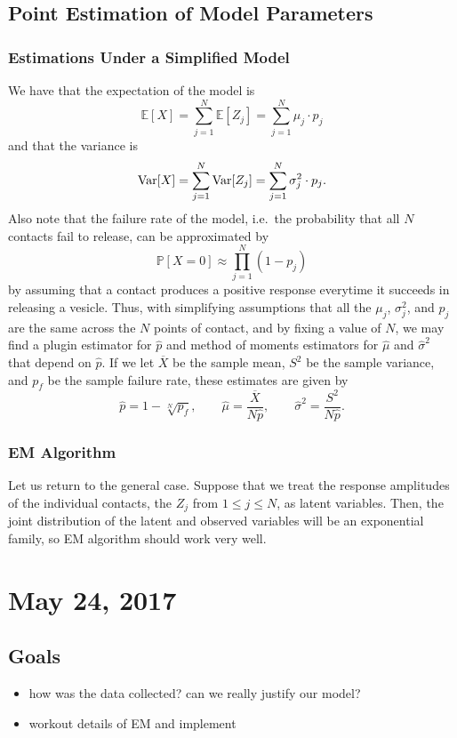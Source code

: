 \documentclass{article}
\begin{document}
\subsection{Point Estimation of Model Parameters}
\subsubsection{Estimations Under a Simplified Model}
We have that the expectation of the model is
\[
  \mathbb E[X] = \sum_{j=1}^N \mathbb E[Z_j] = \sum_{j=1}^N \mu_j\cdot p_j
\]
and that the variance is
\[
  \operatorname{Var}[X] = \sum_{j=1}^N \operatorname{Var}[Z_j] = \sum_{j=1}^N \sigma_j^2\cdot p_j.
\]
Also note that the failure rate of the model, i.e.\ the probability that all $N$ contacts fail to release, can be approximated by
\[
  \mathbb P[X = 0]\approx \prod_{j=1}^N (1-p_j)
\]
by assuming that a contact produces a positive response everytime it succeeds in releasing a vesicle. Thus, with simplifying assumptions that all the $\mu_j$, $\sigma_j^2$, and $p_j$ are the same across the $N$ points of contact, and by fixing a value of $N$, we may find a plugin estimator for $\hat p$ and method of moments estimators for $\hat\mu$ and $\hat\sigma^2$ that depend on $\hat p$. If we let $\overline X$ be the sample mean, $S^2$ be the sample variance, and $p_f$ be the sample failure rate, these estimates are given by
\[
  \hat p = 1 - \sqrt[N]{p_f}, \qquad \hat\mu = \frac{\overline X}{N\hat p}, \qquad \hat\sigma^2 = \frac{S^2}{N\hat p}.
\]

\subsubsection{EM Algorithm}
Let us return to the general case. Suppose that we treat the response amplitudes of the individual contacts, the $Z_j$ from $1\leq j\leq N$, as latent variables. Then, the joint distribution of the latent and observed variables will be an exponential family, so EM algorithm should work very well.

\section{May 24, 2017}
\subsection{Goals}
\begin{itemize}
  \item how was the data collected? can we really justify our model?
  \item workout details of EM and implement
\end{itemize}
\end{document}
